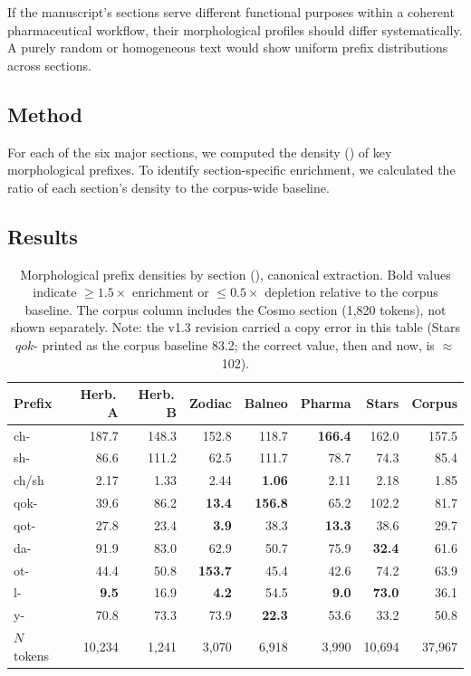 \documentclass[11pt,a4paper]{article}
\begin{document}
If the manuscript's sections serve different functional purposes within a coherent pharmaceutical workflow, their morphological profiles should differ systematically. A purely random or homogeneous text would show uniform prefix distributions across sections.

\subsection{Method}

For each of the six major sections, we computed the density (\textperthousand) of key morphological prefixes. To identify section-specific enrichment, we calculated the ratio of each section's density to the corpus-wide baseline.

\subsection{Results}

\begin{table}[H]
\centering
\small
\begin{tabular}{lrrrrrrr}
\toprule
\textbf{Prefix} & \textbf{Herb.\,A} & \textbf{Herb.\,B} & \textbf{Zodiac} & \textbf{Balneo} & \textbf{Pharma} & \textbf{Stars} & \textbf{Corpus} \\
\midrule
ch-     & 187.7 & 148.3 & 152.8 & 118.7 & \textbf{166.4} & 162.0 & 157.5 \\
sh-     &  86.6 & 111.2 &  62.5 & 111.7 &  78.7 &  74.3 &  85.4 \\
ch/sh   &  2.17 &  1.33 &  2.44 & \textbf{1.06} &  2.11 &  2.18 &  1.85 \\
qok-    &  39.6 &  86.2 & \textbf{13.4} & \textbf{156.8} &  65.2 & 102.2 &  81.7 \\
qot-    &  27.8 &  23.4 & \textbf{3.9} &  38.3 & \textbf{13.3} &  38.6 &  29.7 \\
da-     &  91.9 &  83.0 &  62.9 &  50.7 &  75.9 & \textbf{32.4} &  61.6 \\
ot-     &  44.4 &  50.8 & \textbf{153.7} &  45.4 &  42.6 &  74.2 &  63.9 \\
l-      & \textbf{9.5} &  16.9 & \textbf{4.2} &  54.5 & \textbf{9.0} & \textbf{73.0} &  36.1 \\
y-      &  70.8 &  73.3 &  73.9 & \textbf{22.3} &  53.6 &  33.2 &  50.8 \\
\midrule
$N$ tokens & 10{,}234 & 1{,}241 & 3{,}070 & 6{,}918 & 3{,}990 & 10{,}694 & 37{,}967 \\
\bottomrule
\end{tabular}
\caption{Morphological prefix densities by section (\textperthousand), canonical extraction. Bold values indicate $\geq 1.5\times$ enrichment or $\leq 0.5\times$ depletion relative to the corpus baseline. The corpus column includes the Cosmo section (1{,}820 tokens), not shown separately. Note: the v1.3 revision carried a copy error in this table (Stars $qok$- printed as the corpus baseline 83.2; the correct value, then and now, is $\approx$102).}
\end{table}
\end{document}
